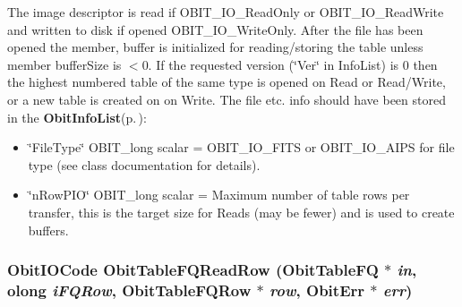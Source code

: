 The image descriptor is read if OBIT\_\-IO\_\-Read\-Only or OBIT\_\-IO\_\-Read\-Write and written to disk if opened OBIT\_\-IO\_\-Write\-Only. After the file has been opened the member, buffer is initialized for reading/storing the table unless member buffer\-Size is $<$0. If the requested version (\char`\"{}Ver\char`\"{} in Info\-List) is 0 then the highest numbered table of the same type is opened on Read or Read/Write, or a new table is created on on Write. The file etc. info should have been stored in the {\bf Obit\-Info\-List}{\rm (p.\,\pageref{structObitInfoList})}: \begin{itemize}
\item \char`\"{}File\-Type\char`\"{} OBIT\_\-long scalar = OBIT\_\-IO\_\-FITS or OBIT\_\-IO\_\-AIPS for file type (see class documentation for details). \item \char`\"{}n\-Row\-PIO\char`\"{} OBIT\_\-long scalar = Maximum number of table rows per transfer, this is the target size for Reads (may be fewer) and is used to create buffers. 
\end{itemize}
\subsubsection{\setlength{\rightskip}{0pt plus 5cm}Obit\-IOCode Obit\-Table\-FQRead\-Row ({\bf Obit\-Table\-FQ} $\ast$ {\em in}, {\bf olong} {\em i\-FQRow}, {\bf Obit\-Table\-FQRow} $\ast$ {\em row}, {\bf Obit\-Err} $\ast$ {\em err})}\label{ObitTableFQ_8c_a22}


